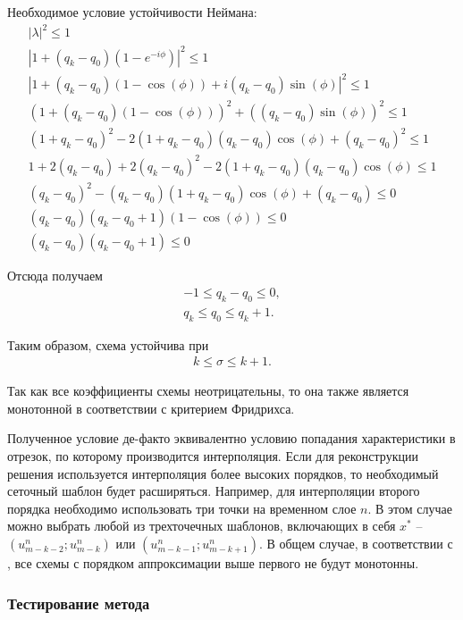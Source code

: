 Необходимое условие устойчивости Неймана:
\begin{eqnarray}
|\lambda|^2 \le 1 \nonumber\\
| 1 + (q_k - q_0) (1 - e^{-i\phi}) |^2 \le 1 \nonumber\\
| 1 + (q_k - q_0) (1 - \cos(\phi)) + i(q_k - q_0)\sin(\phi) |^2 \le 1 \nonumber\\
( 1 + (q_k - q_0) (1 - \cos(\phi)))^2 + ((q_k - q_0)\sin(\phi))^2 \le 1 \nonumber\\
( 1 + q_k - q_0)^2 - 2 ( 1 + q_k - q_0)(q_k - q_0) \cos(\phi) + (q_k - q_0)^2 \le 1 \nonumber\\
1 + 2 (q_k - q_0) + 2 (q_k - q_0)^2 - 2 ( 1 + q_k - q_0)(q_k - q_0) \cos(\phi) \le 1 \nonumber\\
(q_k - q_0)^2 - (q_k - q_0) ( 1 + q_k - q_0 ) \cos(\phi) + (q_k - q_0) \le 0 \nonumber\\
(q_k - q_0)(q_k - q_0 + 1)(1 - \cos(\phi)) \le 0 \nonumber\\
(q_k - q_0)(q_k - q_0 + 1) \le 0
\end{eqnarray}

Отсюда получаем
\begin{eqnarray}
-1 \le q_k - q_0 \le 0, \nonumber\\
q_k \le q_0 \le q_k + 1.
\end{eqnarray}

Таким образом, схема устойчива при 
\begin{eqnarray}
k \le \sigma \le k+1.
\end{eqnarray}

Так как все коэффициенты схемы неотрицательны, то она также является монотонной в соответствии с критерием Фридрихса.

Полученное условие де-факто эквивалентно условию попадания характеристики в отрезок, по которому производится интерполяция. Если для реконструкции решения используется интерполяция более высоких порядков, то необходимый сеточный шаблон будет расширяться. Например, для интерполяции второго порядка необходимо использовать три точки на временном слое $n$. В этом случае можно выбрать любой из трехточечных шаблонов, включающих в себя $x^*$ -- $(u_{m-k-2}^n; u_{m-k}^n)$ или $(u_{m-k-1}^n; u_{m-k+1}^n)$. В общем случае, в соответствии с \cite{magomedov}, все схемы с порядком аппроксимации выше первого не будут монотонны.

\clearpage
\newpage

\subsubsection{Тестирование метода}

